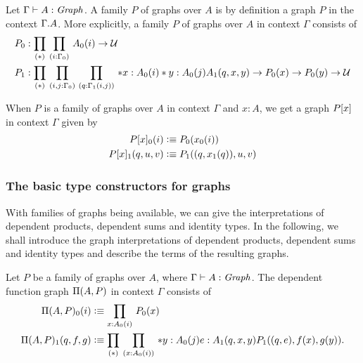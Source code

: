 \begin{defn}
Let $\Gamma\vdash A:\mathit{Graph}$. A family $P$ of graphs over $A$ is by
definition a graph $P$ in the context $\ctxext{\Gamma}{A}$. More explicitly, a family
$P$ of graphs over $A$ in context $\Gamma$ consists of
\begin{align*}
P_0 & : \prd*{i:\Gamma_0}A_0(i)\to\type\\
P_1 & : \prd*{i,j:\Gamma_0}{q:\Gamma_1(i,j)}*{x:A_0(i)}*{y:A_0(j)} A_1(q,x,y)\to P_0(x)\to P_0(y)\to\type
\end{align*}
\end{defn}

\begin{defn}
When $P$ is a family of graphs over $A$ in context $\Gamma$ and $x:A$, we
get a graph $\subst{x}{P}$ in context $\Gamma$ given by
\begin{align*}
\subst{x}{P}_0(i) & \defeq P_0(x_0(i))\\
\subst{x}{P}_1(q,u,v) & \defeq P_1(\pairr{q,x_1(q)},u,v)
\end{align*}
\end{defn}

\subsubsection{The basic type constructors for graphs}
With families of graphs being available, we can give the interpretations of
dependent products, dependent sums and identity types. In the following, we
shall introduce the graph interpretations of dependent products, dependent
sums and identity types and describe the terms of the resulting graphs.

\begin{defn}
Let $P$ be a family of graphs over $A$, where $\Gamma\vdash A:\mathit{Graph}$. 
The dependent function graph $\Pi(A,P)$ in context $\Gamma$ consists of
\begin{align*}
\mprd{A}{P}_0(i) & \defeq \prd{x:A_0(i)}P_0(x)\\
\mprd{A}{P}_1(q,f,g) & \defeq \prd*{x:A_0(i)}*{y:A_0(j)}{e:A_1(q,x,y)}P_1(\pairr{q,e},f(x),g(y)).
\end{align*}
\end{defn}

